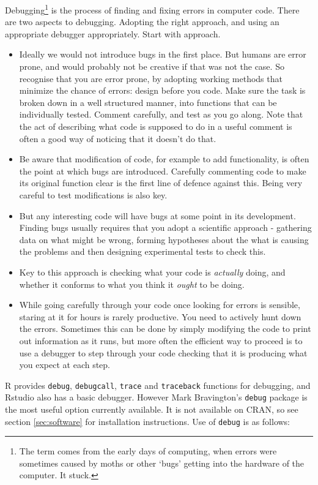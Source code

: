 \documentclass[10pt] {article}
\theoremstyle{definition}
\begin{document}
Debugging\footnote{The term comes from the early days of computing, when errors were sometimes caused by moths or other `bugs' getting into the hardware of the computer. It stuck.} is the process of finding and fixing errors in computer code. There are two aspects to debugging. Adopting the right approach, and using an appropriate debugger appropriately. Start with approach. 
\begin{itemize}
\item  Ideally we would not introduce bugs in the first place. But humans are error prone, and would probably not be creative if that was not the case. So recognise that you are error prone, by adopting working methods that minimize the chance of errors: design before you code. Make sure the task is broken down in a well structured manner, into functions that can be individually tested. Comment carefully, and test as you go along. Note that the act of describing what code is supposed to do in a useful comment is often a good way of noticing that it doesn't do that. 
\item Be aware that modification of code, for example to add functionality, is often the point at which bugs are introduced. Carefully commenting code to make its original function clear is the first line of defence against this. Being very careful to test modifications is also key. 
\item But any interesting code will have bugs at some point in its development. Finding bugs usually requires that you adopt a scientific approach - gathering data on what might be wrong, forming hypotheses about the what is causing the problems and then designing experimental tests to check this.
\item Key to this approach is checking what your code is {\em actually} doing, and whether it conforms to what you think it {\em ought} to be doing. 
\item While going carefully through your code once looking for errors is sensible, staring at it for hours is rarely productive. You need to actively hunt down the errors. Sometimes this can be done by simply modifying the code to print out information as it runs, but more often the efficient way to proceed is to use a debugger to step through your code checking that it is producing what you expect at each step.       
\end{itemize}

R provides {\tt debug}, {\tt debugcall}, {\tt trace} and {\tt traceback} functions for debugging, and Rstudio also has a basic debugger. However Mark Bravington's {\tt debug} package is the most useful option currently available. It is not available on CRAN, so see section \ref{sec:software} for installation instructions. Use of {\tt debug} is as follows: 
\end{document}
